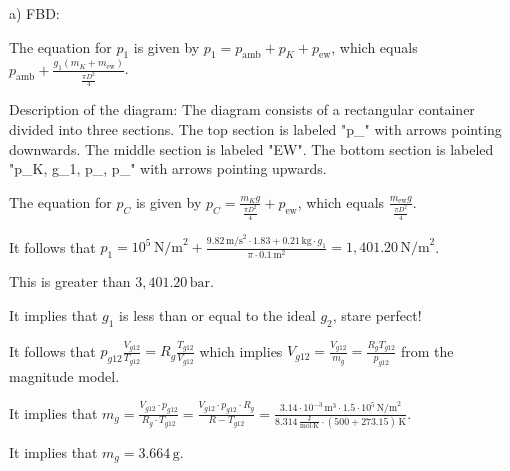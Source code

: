 a) FBD:

The equation for \( p_1 \) is given by \( p_1 = p_{\text{amb}} + p_K + p_{\text{ew}} \), which equals \( p_{\text{amb}} + \frac{g_1 (m_K + m_{\text{ew}})}{\frac{\pi D^2}{4}} \).

Description of the diagram:
The diagram consists of a rectangular container divided into three sections. The top section is labeled "p_{}" with arrows pointing downwards. The middle section is labeled "EW". The bottom section is labeled "p_K, g_1, p_{}, p_{}" with arrows pointing upwards.

The equation for \( p_C \) is given by \( p_C = \frac{m_K g}{\frac{\pi D^2}{4}} + p_{\text{ew}} \), which equals \( \frac{m_{\text{ew}} g}{\frac{\pi D^2}{4}} \).

It follows that \( p_1 = 10^5 \, \text{N/m}^2 + \frac{9.82 \, \text{m/s}^2 \cdot 1.83 + 0.21 \, \text{kg} \cdot g_1}{\pi \cdot 0.1 \, \text{m}^2} = 1,401.20 \, \text{N/m}^2 \).

This is greater than \( 3,401.20 \, \text{bar} \).

It implies that \( g_1 \) is less than or equal to the ideal \( g_2 \), stare perfect!

It follows that \( p_{g12} \frac{V_{g12}}{T_{g12}} = R_g \frac{T_{g12}}{V_{g12}} \) which implies \( V_{g12} = \frac{V_{g12}}{m_g} = \frac{R_g T_{g12}}{p_{g12}} \) from the magnitude model.

It implies that \( m_g = \frac{V_{g12} \cdot p_{g12}}{R_g \cdot T_{g12}} = \frac{V_{g12} \cdot p_{g12} \cdot R_g}{R - T_{g12}} = \frac{3.14 \cdot 10^{-3} \, \text{m}^3 \cdot 1.5 \cdot 10^5 \, \text{N/m}^2}{8.314 \, \frac{\text{J}}{\text{mol} \cdot \text{K}} \cdot (500 + 273.15) \, \text{K}} \).

It implies that \( m_g = 3.664 \, \text{g} \).